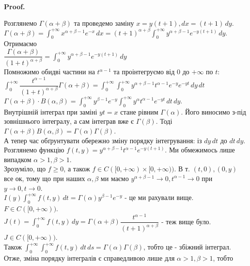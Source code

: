 \documentclass[a4paper, 10pt]{article}
\makeatletter
\def\huge{\displaystyle}
\def\qed{$\blacksquare$}
\theoremstyle{theoremdd}
\theoremstyle{theoremdd}
\theoremstyle{theoremdd}
\theoremstyle{theoremdd}
\theoremstyle{theoremdd}
\theoremstyle{theoremdd}
\theoremstyle{theoremdd}
\theoremstyle{theoremdd}
\theoremstyle{theoremdd}
\renewenvironment{proof}[1][Proof.\\]{\par
\pushQED{\hfill \qed}%
\normalfont \topsep6\p@\@plus6\p@\relax
\trivlist
\item\relax
{\bfseries
#1\@addpunct{.}}\hspace\labelsep\ignorespaces
}{%
\popQED\endtrivlist\@endpefalse
}
\makeatother
\begin{document}
\begin{proof}
Розглянемо $\Gamma(\alpha+\beta)$ та проведемо заміну $x = y(t+1), dx = (t+1)\,dy$.\\
$\Gamma(\alpha+\beta) = \huge \int_0^{+\infty} x^{\alpha+\beta-1} e^{-x}\,dx = (t+1)^{\alpha+\beta} \int_0^{+\infty} y^{\alpha+\beta-1}e^{-y(t+1)}\,dy$.\\
Отримаємо\\
$\dfrac{\Gamma(\alpha+\beta)}{(1+t)^{\alpha+\beta}} = \huge \int_0^{+\infty} y^{\alpha+\beta-1}e^{-y(t+1)}\,dy$\\
Помножимо обидві частини на $t^{\alpha-1}$ та проінтегруємо від $0$ до $+\infty$ по $t$:\\
$\huge \int_0^{+\infty} \dfrac{t^{\alpha-1}}{(1+t)^{\alpha+\beta}} \Gamma(\alpha+\beta) = \huge \int_0^{+\infty} \int_0^{+\infty} y^{\alpha+\beta-1} t^{\alpha-1}e^{-y}e^{-yt}\,dy\,dt$\\
$\Gamma(\alpha+\beta) \cdot B(\alpha,\beta) = \huge \int_0^{+\infty} y^{\beta-1} e^{-y} \int_0^{+\infty} y^{\alpha} t^{\alpha-1}e^{-yt}\,dt \,dy$.\\
Внутрішній інтеграл при заміні $yt = x$ стане рівним $\Gamma(\alpha)$. Його виносимо з-під зовнішнього інтегралу, а сам інтеграв вже є $\Gamma(\beta)$. Тоді\\
$\Gamma(\alpha+\beta) B(\alpha, \beta) = \Gamma(\alpha) \Gamma(\beta)$.
\bigskip \\
А тепер час обґрунтувати обережно зміну порядку інтегрування: із $dy \,dt$ до $dt\,dy$.\\
Розглянемо функцію $f(t,y) = y^{\alpha+\beta-1} t^{\alpha-1}e^{-y(t+1)}$. Ми обмежимось лише випадком $\alpha >1, \beta > 1$.\\
Зрозуміло, що $f \geq 0$, а також $f \in C([0,+\infty) \times [0,+\infty))$. В т. $(t,0),(0,y)$ все ок, тому що при наших $\alpha,\beta$ ми маємо $y^{\alpha+\beta-1} \to 0, t^{\alpha-1} \to 0$ при $y \to 0, t \to 0$.\\
$I(y) \huge\int_0^{+\infty} f(t,y)\,dt = \Gamma(\alpha) y^{\beta-1}e^{-y}$ - це ми рахували вище. $F \in C([0,+\infty))$.\\
$J(t) = \huge\int_0^{+\infty} f(t,y)\,dy = \Gamma(\alpha+\beta) \dfrac{t^{\alpha-1}}{(t+1)^{\alpha+\beta}}$ - теж вище було. $J \in C([0,+\infty))$.\\
Також $\huge\int_0^{+\infty} \huge\int_0^{+\infty} f(t,y)\,dt\,ds = \Gamma(\alpha) \Gamma(\beta)$, тобто це - збіжний інтеграл.\\
Отже, зміна порядку інтегралів є справедливою лише для $\alpha >1, \beta > 1$, тобто\\

\end{proof}
\end{document}
